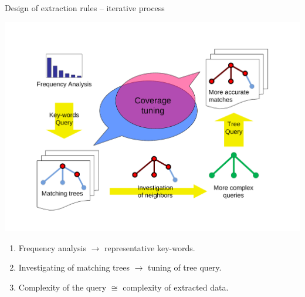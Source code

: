 \documentclass[xcolor=dvipsnames]{beamer}
\begin{document}
\begin{frame}{Design of extraction rules -- iterative process}
\begin{center}
\includegraphics[height=0.8\vsize, angle=-90]{img/coverge_tuning}
\end{center}
\begin{enumerate}
	\item \alert{Frequency analysis} $\rightarrow$ representative key-words.
	\item Investigating of matching trees $\rightarrow$ \alert{tuning} of tree query.
	\item \alert{Complexity} of the query $\cong$ complexity of extracted data.
\end{enumerate}
\end{frame}
\end{document}
